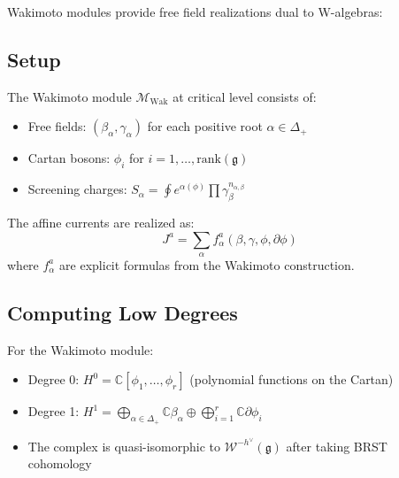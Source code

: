 Wakimoto modules provide free field realizations dual to W-algebras:
 
\subsection{Setup}
 
\begin{definition}
The Wakimoto module $\mathcal{M}_{\text{Wak}}$ at critical level consists of:
\begin{itemize}
\item Free fields: $(\beta_\alpha, \gamma_\alpha)$ for each positive root $\alpha \in \Delta_+$
\item Cartan bosons: $\phi_i$ for $i = 1, \ldots, \text{rank}(\mathfrak{g})$
\item Screening charges: $S_\alpha = \oint e^{\alpha(\phi)} \prod \gamma_\beta^{n_{\alpha,\beta}}$
\end{itemize}
The affine currents are realized as:
\[
J^a = \sum_{\alpha} f^a_\alpha(\beta, \gamma, \phi, \partial\phi)
\]
where $f^a_\alpha$ are explicit formulas from the Wakimoto construction.
\end{definition}
 
\subsection{Computing Low Degrees}
 
\begin{theorem}
For the Wakimoto module:
\begin{itemize}
\item Degree 0: $H^0 = \mathbb{C}[\phi_1, \ldots, \phi_r]$ (polynomial functions on the Cartan)
\item Degree 1: $H^1 = \bigoplus_{\alpha \in \Delta_+} \mathbb{C}\beta_\alpha \oplus \bigoplus_{i=1}^r \mathbb{C}\partial\phi_i$
\item The complex is quasi-isomorphic to $\mathcal{W}^{-h^\vee}(\mathfrak{g})$ after taking BRST cohomology
\end{itemize}
\end{theorem}
 
